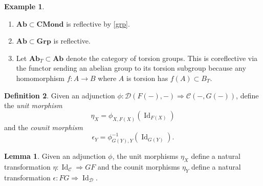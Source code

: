 \documentclass[10pt,letterpaper,cm]{nupset}
\theoremstyle{definition}
\newtheorem{definition}{Definition}
\newtheorem{exmp}[definition]{Example}
\theoremstyle{theorem}
\newtheorem{lemma}[theorem]{Lemma}
\theoremstyle{remark}
\newcommand{\1}{\mathbf{1}}
\renewcommand{\c}{\mathscr{C}}
\renewcommand{\d}{\mathscr{D}}
\newcommand{\0}{\vec 0}
\DeclareMathOperator{\id}{Id}
\begin{document}
\begin{exmp} $ $
\begin{enumerate}
\item $\mathbf{Ab}\subset \mathbf{CMond}$ is reflective by \cref{grp}. 
\item $\mathbf{Ab}\subset \mathbf{Grp}$ is reflective. 
\item
Let $\mathbf{Ab}_T\subset \mathbf{Ab}$ denote the category of torsion groups. This is coreflective via the functor sending an abelian group to its torsion subgroup  because any homomorphism $f: A \to B$ where $A$ is torsion has $f(A) \subset B_T$.
\end{enumerate}
\end{exmp}

\begin{definition}
Given an adjunction $\phi: \d(F(-), -) \Rightarrow \c(-, G(-))$, define the \textit{unit morphism} $$\eta_X =\phi_{X, F(X)}(\id_{F(X)})$$ and the \textit{counit morphism} $$\epsilon_Y =\phi_{G(Y), Y}^{-1}(\id_{G(Y)}).$$
\end{definition}

\begin{lemma}
Given an adjunction $\phi$, the unit morphisms $\eta_X$ define a natural transformation $\eta: \id_{\c} \Rightarrow GF$ and the counit morphisms $\eta_Y$ define a natural transformation $\epsilon: FG \Rightarrow \id_{\d}$.
\end{lemma}
\end{document}
